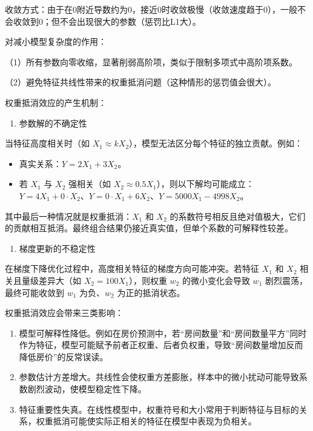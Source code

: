 收敛方式：由于在0附近导数约为0，接近0时收敛极慢（收敛速度趋于0），一般不会收敛到0；但不会出现很大的参数（惩罚比L1大）。

对减小模型复杂度的作用：

（1）所有参数向零收缩，显著削弱高阶项，类似于限制多项式中高阶项系数。

（2）避免特征共线性带来的权重抵消问题（这种情形的惩罚值会很大）。

权重抵消效应的产生机制：

\begin{enumerate}
\def\labelenumi{\arabic{enumi}.}
\tightlist
\item
  参数解的不确定性
\end{enumerate}

当特征高度相关时（如 \(X_1\approx kX_2\)），模型无法区分每个特征的独立贡献。例如：

\begin{itemize}
\tightlist
\item
  真实关系：\(Y=2X_1+3X_2\)。
\item
  若 \(X_1\) 与 \(X_2\) 强相关（如 \(X_2\approx 0.5X_1\)），则以下解均可能成立：\(Y=4X_1+0\cdot X_2\)、\(Y=0\cdot X_1+6X_2\)、\(Y=5000X_1-4998X_2\)。
\end{itemize}

其中最后一种情况就是权重抵消：\(X_1\) 和 \(X_2\) 的系数符号相反且绝对值极大，它们的贡献相互抵消。最终组合结果仍接近真实值，但单个系数的可解释性较差。

\begin{enumerate}
\def\labelenumi{\arabic{enumi}.}
\setcounter{enumi}{1}
\tightlist
\item
  梯度更新的不稳定性
\end{enumerate}

在梯度下降优化过程中，高度相关特征的梯度方向可能冲突。若特征 \(X_1\) 和 \(X_2\) 相关且量级差异大（如 \(X_2=100X_1\)），则权重 \(w_2\) 的微小变化会导致 \(w_1\) 剧烈震荡，最终可能收敛到 \(w_1\) 为负、\(w_2\) 为正的抵消状态。

权重抵消效应会带来三类影响：

\begin{enumerate}
\def\labelenumi{\arabic{enumi}.}
\item
  模型可解释性降低。例如在房价预测中，若``房间数量''和``房间数量平方''同时作为特征，模型可能赋予前者正权重、后者负权重，导致``房间数量增加反而降低房价''的反常误读。
\item
  参数估计方差增大。共线性会使权重方差膨胀，样本中的微小扰动可能导致系数剧烈波动，使模型稳定性下降。
\item
  特征重要性失真。在线性模型中，权重符号和大小常用于判断特征与目标的关系，权重抵消可能使实际正相关的特征在模型中表现为负相关。
\end{enumerate}


